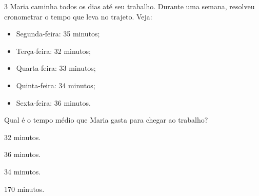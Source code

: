 




\num{3} Maria caminha todos os dias até seu trabalho. Durante uma semana,
resolveu cronometrar o tempo que leva no trajeto. Veja:

\begin{itemize}
\item Segunda-feira: 35 minutos;

\item Terça-feira: 32 minutos;

\item Quarta-feira: 33 minutos;

\item Quinta-feira: 34 minutos;

\item Sexta-feira: 36 minutos.
\end{itemize}

Qual é o tempo médio que Maria gasta para chegar ao trabalho?

\begin{escolha}[itemsep=0pt]
\item 32 minutos.
\item 36 minutos.
\item 34 minutos.
\item 170 minutos.
\end{escolha}





